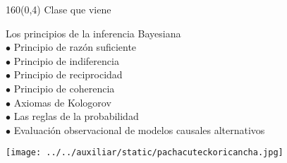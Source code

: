 \documentclass[shownotes,aspectratio=169]{beamer}
\begin{document}
\begin{frame}
\begin{textblock}{160}(0,4)
\LARGE \centering Clase que viene
\end{textblock} 
\vspace{1cm} \centering


\vspace{0.3cm}

\Large Los principios de la inferencia Bayesiana \\ \justify \large
$\bullet$ Principio de razón suficiente \\
$\bullet$ Principio de indiferencia \\
$\bullet$ Principio de reciprocidad \\
$\bullet$ Principio de coherencia \\
$\bullet$ Axiomas de Kologorov \\
$\bullet$ Las reglas de la probabilidad \\
$\bullet$ Evaluación observacional de modelos causales alternativos \\
\end{frame}
 
 
\begin{frame}[plain]
\centering
  \texttt{[image: ../../auxiliar/static/pachacuteckoricancha.jpg]}
\end{frame}
\end{document}

